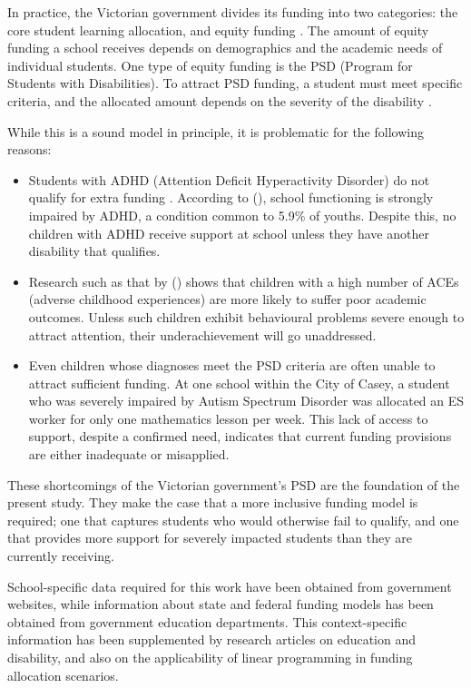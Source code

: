 \documentclass[11pt, a4paper]{article}
\begin{document}
    In practice, the Victorian government divides its funding into two categories: the core student learning allocation, and equity funding \parencite{srp_vic}. The amount of equity funding a school receives depends on demographics and the academic needs of individual students. One type of equity funding is the PSD (Program for Students with Disabilities). To attract PSD funding, a student must meet specific criteria, and the allocated amount depends on the severity of the disability \parencite{psd_guidelines}.

    While this is a sound model in principle, it is problematic for the following reasons:

    \begin{itemize}
        \item Students with ADHD (Attention Deficit Hyperactivity Disorder) do not qualify for extra funding \parencite{psd_guidelines}. According to  (), school functioning is strongly impaired by ADHD, a condition common to 5.9\% of youths. Despite this, no children with ADHD receive support at school unless they have another disability that qualifies.
        \item Research such as that by  () shows that children with a high number of ACEs (adverse childhood experiences) are more likely to suffer poor academic outcomes. Unless such children exhibit behavioural problems severe enough to attract attention, their underachievement will go unaddressed.
        \item Even children whose diagnoses meet the PSD criteria are often unable to attract sufficient funding. At one school within the City of Casey, a student who was severely impaired by Autism Spectrum Disorder was allocated an ES worker for only one mathematics lesson per week. This lack of access to support, despite a confirmed need, indicates that current funding provisions are either inadequate or misapplied.
    \end{itemize}

    These shortcomings of the Victorian government's PSD are the foundation of the present study. They make the case that a more inclusive funding model is required; one that captures students who would otherwise fail to qualify, and one that provides more support for severely impacted students than they are currently receiving.

    School-specific data required for this work have been obtained from government websites, while information about state and federal funding models has been obtained from government education departments. This context-specific information has been supplemented by research articles on education and disability, and also on the applicability of linear programming in funding allocation scenarios.
\end{document}
